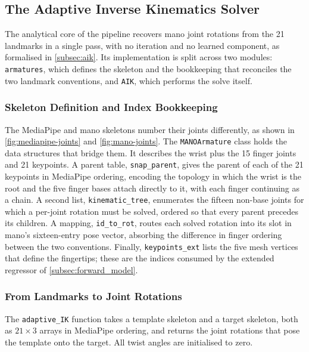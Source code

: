 \subsection{The Adaptive Inverse Kinematics Solver}\label{subsec:ik_impl}

The analytical core of the pipeline recovers \acrshort{mano} joint rotations from
the 21 landmarks in a single pass, with no iteration and no learned component, as
formalised in \autoref{subsec:aik}. Its implementation is split across two
modules: \texttt{armatures}, which defines the skeleton and the bookkeeping that
reconciles the two landmark conventions, and \texttt{AIK}, which performs the
solve itself.

\subsubsection{Skeleton Definition and Index Bookkeeping}\label{subsubsec:armature}

The MediaPipe and \acrshort{mano} skeletons number their joints differently, as
shown in \autoref{fig:mediapipe-joints} and \autoref{fig:mano-joints}. The
\texttt{MANOArmature} class holds the data structures that bridge them. It
describes the wrist plus the 15 finger joints and 21 keypoints. A parent table,
\texttt{snap\_parent}, gives the parent of each of the 21 keypoints in MediaPipe
ordering, encoding the topology in which the wrist is the root and the five
finger bases attach directly to it, with each finger continuing as a chain. A
second list, \texttt{kinematic\_tree}, enumerates the fifteen non-base joints for
which a per-joint rotation must be solved, ordered so that every parent precedes
its children. A mapping, \texttt{id\_to\_rot}, routes each solved rotation into
its slot in \acrshort{mano}'s sixteen-entry pose vector, absorbing the difference
in finger ordering between the two conventions. Finally, \texttt{keypoints\_ext}
lists the five mesh vertices that define the fingertips; these are the indices
consumed by the extended regressor of \autoref{subsec:forward_model}.

\subsubsection{From Landmarks to Joint Rotations}\label{subsubsec:aik_impl}

The \texttt{adaptive\_IK} function takes a template skeleton and a target
skeleton, both as $21 \times 3$ arrays in MediaPipe ordering, and returns the
joint rotations that pose the template onto the target. All twist angles are
initialised to zero.


